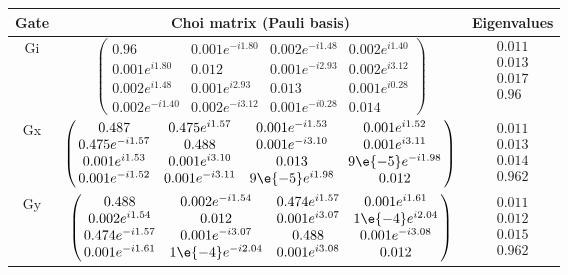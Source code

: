 {\begin{table}[h]
\begin{center}
\begin{tabular}[l]{|c|c|c|}
\hline
Gate & Choi matrix (Pauli basis) & Eigenvalues \\ \hline
Gi & $ \left(\!\!\begin{array}{cccc}
0.96 & 0.001e^{-i1.80} & 0.002e^{-i1.48} & 0.002e^{i1.40} \\ 
0.001e^{i1.80} & 0.012 & 0.001e^{-i2.93} & 0.002e^{i3.12} \\ 
0.002e^{i1.48} & 0.001e^{i2.93} & 0.013 & 0.001e^{i0.28} \\ 
0.002e^{-i1.40} & 0.002e^{-i3.12} & 0.001e^{-i0.28} & 0.014
 \end{array}\!\!\right) $
 & $ \begin{array}{c}
0.011 \\ 
0.013 \\ 
0.017 \\ 
0.96
 \end{array} $
 \\ \hline
Gx & $ \left(\!\!\begin{array}{cccc}
0.487 & 0.475e^{i1.57} & 0.001e^{-i1.53} & 0.001e^{i1.52} \\ 
0.475e^{-i1.57} & 0.488 & 0.001e^{-i3.10} & 0.001e^{i3.11} \\ 
0.001e^{i1.53} & 0.001e^{i3.10} & 0.013 & 9\e{-5}e^{-i1.98} \\ 
0.001e^{-i1.52} & 0.001e^{-i3.11} & 9\e{-5}e^{i1.98} & 0.012
 \end{array}\!\!\right) $
 & $ \begin{array}{c}
0.011 \\ 
0.013 \\ 
0.014 \\ 
0.962
 \end{array} $
 \\ \hline
Gy & $ \left(\!\!\begin{array}{cccc}
0.488 & 0.002e^{-i1.54} & 0.474e^{i1.57} & 0.001e^{i1.61} \\ 
0.002e^{i1.54} & 0.012 & 0.001e^{i3.07} & 1\e{-4}e^{i2.04} \\ 
0.474e^{-i1.57} & 0.001e^{-i3.07} & 0.488 & 0.001e^{-i3.08} \\ 
0.001e^{-i1.61} & 1\e{-4}e^{-i2.04} & 0.001e^{i3.08} & 0.012
 \end{array}\!\!\right) $
 & $ \begin{array}{c}
0.011 \\ 
0.012 \\ 
0.015 \\ 
0.962
 \end{array} $
 \\ \hline
\end{tabular}


\end{center}
\end{table}}
